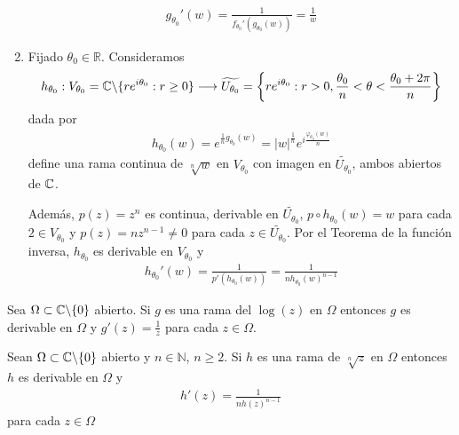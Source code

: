 \begin{ejemplo}
\begin{enumerate}
              \begin{align*}
                  g_{\theta_0}'(w) = \frac{1}{f_{\theta_0}'(g_{\theta_0}(w))} = \frac{1}{w}
              \end{align*}
        \item Fijado $\theta_0 \in \mathbb{R}$. Consideramos
              \begin{align*}
                  h_{\theta_0} : V_{\theta_0}  = \mathbb{C} \backslash \{re^{i\theta_0} : r\ge 0 \} \longrightarrow \widetilde{U_{\theta_0}} = \left\{re^{i\theta_0} : r > 0, \frac{\theta_0}{n} < \theta < \frac{\theta_0 + 2\pi}{n} \right\}
              \end{align*}
              dada por
              \begin{align*}
                  h_{\theta_0}(w) = e^{\frac{1}{n}g_{\theta_0}(w)} = |w|^{\frac{1}{n}}e^{i\frac{\varphi_{\theta_0}(w)}{n}}
              \end{align*}
              define una rama continua de $\sqrt[n]{w}$ en $V_{\theta_0}$ con imagen en $\widetilde{U_{\theta_0}}$, ambos abiertos de $\mathbb{C}$.

              Además, $p(z) = z^n$ es continua, derivable en $\widetilde{U_{\theta_0}}$,  $p \circ h_{\theta_0}(w) = w$ para cada $2 \in V_{\theta_0}$ y $p(z) = nz^{n-1} \not = 0$ para cada $z \in \widetilde{U_{\theta_0}}$. Por el Teorema de la función inversa, $h_{\theta_0}$ es derivable en $V_{\theta_0}$ y
              \begin{align*}
                  h_{\theta_0}'(w) = \frac{1}{p'(h_{\theta_0}(w))} = \frac{1}{nh_{\theta_0}(w)^{n-1}}
              \end{align*}
    \end{enumerate}
\end{ejemplo}

\begin{teo}
    Sea $\Omega \subset \mathbb{C} \backslash \{0\}$ abierto. Si $g$ es una rama del $\log(z)$ en $\Omega$ entonces $g$ es derivable en $\Omega$ y $g'(z) = \frac{1}{z}$ para cada $z \in \Omega$.
\end{teo}

\begin{teo}
    Sean $\Omega \subset \mathbb{C} \backslash \{0\}$ abierto y $n \in \mathbb{N}$, $n \ge 2$. Si $h$ es una rama de $\sqrt[n]{z}$ en $\Omega$ entonces $h$ es derivable en $\Omega$ y
    \begin{align*}
        h'(z) = \frac{1}{nh(z)^{n-1}}
    \end{align*}
    para cada $z \in \Omega$
\end{teo}

